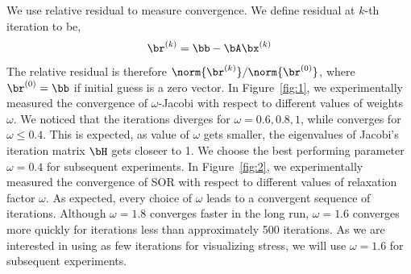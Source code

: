 \documentclass[11pt,titlepage]{article}
\begin{document}
We use relative residual to measure convergence. We define residual at $k$-th iteration to be,
\[
    \br^{(k)} = \bb - \bA \bx^{(k)}
\]
The relative residual is therefore $\norm{\br^{(k)}} / \norm{\br^{(0)}}$, where $\br^{(0)} = \bb$ if initial guess is a zero vector. In Figure~\ref{fig:1}, we experimentally measured the convergence of $\omega$-Jacobi with respect to different values of weights $\omega$. We noticed that the iterations diverges for $\omega=0.6,0.8,1$, while converges for $\omega\leq 0.4$. This is expected, as value of $\omega$ gets smaller, the eigenvalues of Jacobi's iteration matrix $\bH$ gets closeer to 1. We choose the best performing parameter $\omega=0.4$ for subsequent experiments. In Figure~\ref{fig:2}, we experimentally measured the convergence of SOR with respect to different values of relaxation factor $\omega$. As expected, every choice of $\omega$ leads to a convergent sequence of iterations. Although $\omega=1.8$ converges faster in the long run, $\omega=1.6$ converges more quickly for iterations less than approximately 500 iterations. As we are interested in using as few iterations for visualizing stress, we will use $\omega=1.6$ for subsequent experiments.
\end{document}
